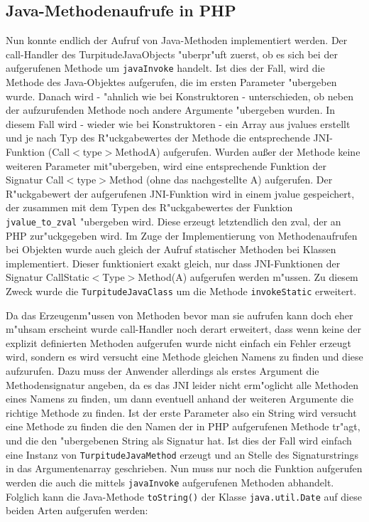 \subsection{Java-Methodenaufrufe in PHP}
\label{sec:chap1:impl:6}

Nun konnte endlich der Aufruf von Java-Methoden implementiert werden. Der call-Handler des TurpitudeJavaObjects "uberpr"uft zuerst, ob es sich bei der
aufgerufenen Methode um \texttt{javaInvoke} handelt. Ist dies der Fall, wird die Methode des Java-Objektes aufgerufen, die im ersten Parameter "ubergeben 
wurde. Danach wird - "ahnlich wie bei Konstruktoren - unterschieden, ob neben der aufzurufenden Methode noch andere Argumente "ubergeben wurden. In diesem
Fall wird - wieder wie bei Konstruktoren - ein Array aus jvalues erstellt und je nach Typ des R"uckgabewertes der Methode die entsprechende JNI-Funktion
(Call$<$type$>$MethodA) aufgerufen. Wurden au\ss er der Methode keine weiteren Parameter mit"ubergeben, wird eine entsprechende Funktion der Signatur
Call$<$type$>$Method (ohne das nachgestellte A) aufgerufen. Der R"uckgabewert der aufgerufenen JNI-Funktion wird in einem jvalue gespeichert, der zusammen mit dem
Typen des R"uckgabewertes der Funktion \texttt{jvalue\_to\_zval} "ubergeben wird. Diese erzeugt letztendlich den zval, der an PHP zur"uckgegeben wird.
Im Zuge der Implementierung von Methodenaufrufen bei Objekten wurde auch gleich der Aufruf statischer Methoden bei Klassen implementiert. Dieser funktioniert exakt 
gleich, nur dass JNI-Funktionen der Signatur CallStatic$<$Type$>$Method(A) aufgerufen werden m"ussen. Zu diesem Zweck wurde die \texttt{TurpitudeJavaClass} um die Methode
\texttt{invokeStatic} erweitert.

Da das Erzeugenm"ussen von Methoden bevor man sie aufrufen kann doch eher m"uhsam erscheint wurde call-Handler noch derart erweitert, dass wenn keine der
explizit definierten Methoden aufgerufen wurde nicht einfach ein Fehler erzeugt wird, sondern es wird versucht eine Methode gleichen Namens zu finden und diese
aufzurufen. Dazu muss der Anwender allerdings als erstes Argument die Methodensignatur angeben, da es das JNI leider nicht erm"oglicht alle Methoden eines Namens
zu finden, um dann eventuell anhand der weiteren Argumente die richtige Methode zu finden. Ist der erste Parameter also ein String wird versucht eine
Methode zu finden die den Namen der in PHP aufgerufenen Methode tr"agt, und die den "ubergebenen String als Signatur hat. Ist dies der Fall wird einfach 
eine Instanz von \texttt{TurpitudeJavaMethod} erzeugt und an Stelle des Signaturstrings in das Argumentenarray geschrieben. Nun muss nur noch die Funktion aufgerufen
werden die auch die mittels \texttt{javaInvoke} aufgerufenen Methoden abhandelt. Folglich kann die Java-Methode \texttt{toString()} der Klasse \texttt{java.util.Date}
auf diese beiden Arten aufgerufen werden:

